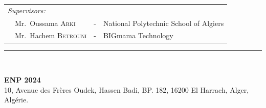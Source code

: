 {\begin{titlepage}
\begin{center}
\begin{tabular}{llcl}
            \\
            \textit{Supervisors:}                                  &   &                                        & \\
            \multicolumn{2}{l}{~~Mr.\ Oussama \textsc{Arki}}       & - & National Polytechnic School of Algiers   \\
            \multicolumn{2}{l}{~~Mr.\ Hachem \textsc{Betrouni}}    & - & BIGmama Technology                       \\
        \end{tabular}
    \end{center}

    \vspace*{12mm}

    \rule{\linewidth}{1pt} \\[5mm]
    \begin{center}
        \textbf{ENP 2024} \\
        10, Avenue des Frères Oudek, Hassen Badi, BP. 182, 16200 El Harrach, Alger, Algérie.
    \end{center}

\end{titlepage}
}